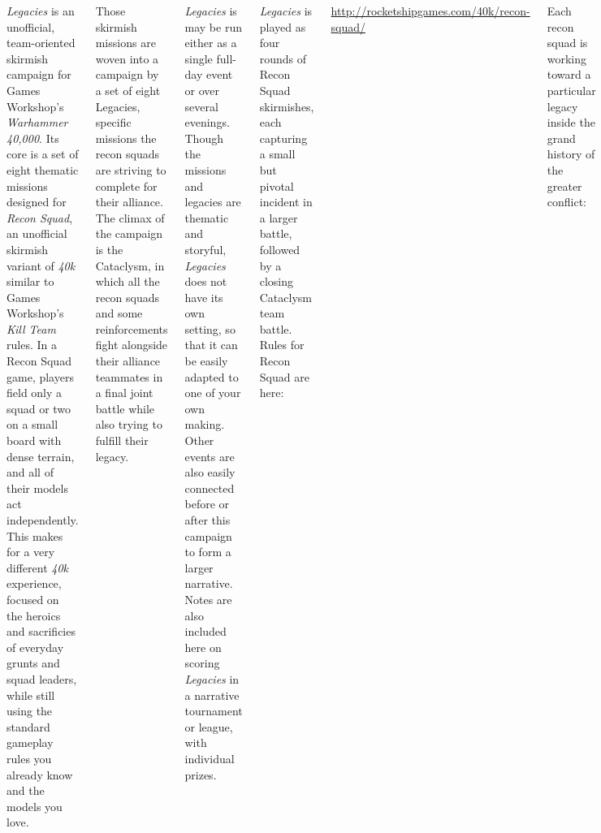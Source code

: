 \clearpage
{}

\begin{columns}

  \emph{Legacies} is an unofficial, team-oriented skirmish campaign
  for Games Workshop's \emph{Warhammer 40,000}.  Its core is a set of
  eight thematic missions designed for \emph{Recon Squad}, an
  unofficial skirmish variant of \emph{40k} similar to Games
  Workshop's \emph{Kill Team} rules.  In a Recon Squad game, players
  field only a squad or two on a small board with dense terrain, and
  all of their models act independently.  This makes for a very
  different \emph{40k} experience, focused on the heroics and
  sacrificies of everyday grunts and squad leaders, while still using
  the standard gameplay rules you already know and the models you
  love.

  Those skirmish missions are woven into a campaign by a set of eight
  Legacies, specific missions the recon squads are striving to
  complete for their alliance.  The climax of the campaign is the
  Cataclysm, in which all the recon squads and some reinforcements
  fight alongside their alliance teammates in a final joint battle
  while also trying to fulfill their legacy.

  \emph{Legacies} is may be run either as a single full-day event or
  over several evenings.  Though the missions and legacies are
  thematic and storyful, \emph{Legacies} does not have its own
  setting, so that it can be easily adapted to one of your own making.
  Other events are also easily connected before or after this campaign
  to form a larger narrative.  Notes are also included here on scoring
  \emph{Legacies} in a narrative tournament or league, with individual
  prizes.


\emph{Legacies} is played as four rounds of Recon Squad skirmishes,
each capturing a small but pivotal incident in a larger battle,
followed by a closing Cataclysm team battle.  Rules for Recon Squad
are here:

\bigskip%
\centerline{\url{http://rocketshipgames.com/40k/recon-squad/}}

\bigskip%
Each recon squad is working toward a particular legacy inside the
grand history of the greater conflict:

\begin{squishitemize}
\item \textbf{Bodyguards:} Fierce defenders of critical battlefield
  leaders and personnel;


\end{squishitemize}
\end{columns}
